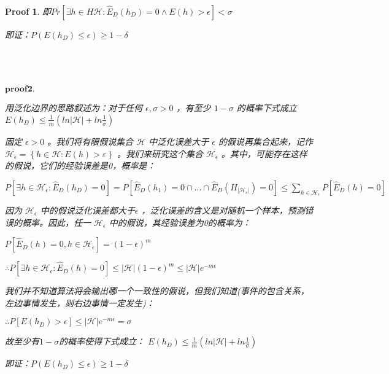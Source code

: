 \documentclass[a4paper,UTF8]{article}
\numberwithin{equation}{section}
\newtheorem*{myProof}{Proof}
\begin{document}
\begin{myProof}
	即$Pr[\exists h\in H\mathcal{H}: \widehat{E}_D(h_D) = 0\wedge E\left ( h \right )>\epsilon ]<\sigma $
	
	即证：$	P\left(E(h_D)\leq\epsilon\right)\geq 1-\delta$
	
	
	
~\\~\\~\\
\noindent$\displaystyle \boldsymbol {proof 2}.$

用泛化边界的思路叙述为：对于任何 $\epsilon,\sigma > 0$ ，有至少 $1-\sigma$ 的概率下式成立
$E\left ( h_D \right )\leq \frac{1}{m}\left ( ln\left| \mathcal{H}\right|+ln\frac{1}{\sigma } \right )$

固定 $\epsilon>0$ 。我们将有限假说集合 $\mathcal{H}$ 中泛化误差大于 $\epsilon $ 的假说再集合起来，记作 $ \mathcal{H_\epsilon }=\left\{ h\in \mathcal{H}:E\left ( h \right )>\varepsilon \right\}$ 。我们来研究这个集合 $\mathcal{H_\epsilon } $ 。其中，可能存在这样的假说，它们的经验误差是0，概率是：

$P\left [ \exists h\in \mathcal{H_\epsilon }:\widehat{E}_D(h_D) = 0\right ] = P[\widehat{E}_D(h_1) = 0\cap ...\cap \widehat{E}_D(H_{|\mathcal{H_\epsilon }|}) = 0]\leq \sum_{h\in \mathcal{H_\epsilon }}^{}P\left [ \widehat{E}_D(h) = 0 \right ]$

因为 $\mathcal{H_\epsilon }$ 中的假说泛化误差都大于$\epsilon$ ，泛化误差的含义是对随机一个样本，预测错误的概率。因此，任一 $\mathcal{H_\epsilon }$ 中的假说，其经验误差为0的概率为：

$P\left [  \widehat{E}_D(h) = 0 , h\in \mathcal{H_\epsilon }\right ] =\left ( 1-\epsilon  \right )^{m}$

$\therefore  P\left [ \exists h \in \mathcal{H_\epsilon }: \widehat{E}_D(h) = 0 \right ]\leq  \left| \mathcal{H}\right| \left ( 1-\epsilon  \right )^{m}\leq  \left| \mathcal{H}\right|e^{-m\epsilon }$

我们并不知道算法将会输出哪一个一致性的假说，但我们知道(事件的包含关系，左边事情发生，则右边事情一定发生)：

$\therefore P\left [ E\left ( h_D \right )>\epsilon  \right ] \leq \left| \mathcal{H}\right|e^{-m\epsilon }=\sigma $

故至少有$1-\sigma$的概率使得下式成立：
$E\left ( h_D \right )\leq \frac{1}{m}\left ( ln\left| \mathcal{H}\right|+ln\frac{1}{\sigma } \right )$

即证：$	P\left(E(h_D)\leq\epsilon\right)\geq 1-\delta$

	
	
	

	
	
	
	
	

\end{myProof}
\end{document}
